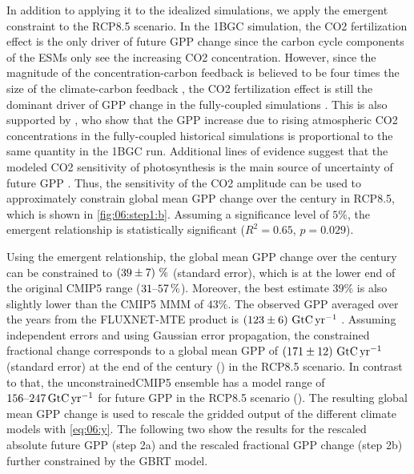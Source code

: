 In addition to applying it to the idealized simulations, we apply the emergent
constraint to the \acs{RCP}8.5 scenario. In the \ac{1BGC} simulation, the
\ac{CO2} fertilization effect is the only driver of future \ac{GPP} change
since the carbon cycle components of the \acp{ESM} only see the increasing
\ac{CO2} concentration. However, since the magnitude of the
concentration-carbon feedback is believed to be four times the size of the
climate-carbon feedback \autocite{Gregory2009}, the \ac{CO2} fertilization
effect is still the dominant driver of \ac{GPP} change in the fully-coupled
simulations \autocite{Huntzinger2017}. This is also supported by
\textcite{Wenzel2016}, who show that the \ac{GPP} increase due to rising
atmospheric \ac{CO2} concentrations in the fully-coupled historical simulations
is proportional to the same quantity in the \ac{1BGC} run. Additional lines of
evidence suggest that the modeled \ac{CO2} sensitivity of photosynthesis is the
main source of uncertainty of future \ac{GPP} \autocite{Arora2013, Haverd2020,
  Rogers2017}. Thus, the sensitivity of the \ac{CO2} amplitude can be used to
approximately constrain global mean \ac{GPP} change over the  century
in \acs{RCP}8.5, which is shown in \cref{fig:06:step1:b}. Assuming a
significance level of $5 \unit{\%}$, the emergent relationship is statistically
significant ($R^2 = 0.65$, $p = 0.029$).

Using the emergent relationship, the global mean \ac{GPP} change over the
 century can be constrained to $\pmrangeunit{39}{7}{\%}$ (standard
error), which is at the lower end of the original \acs{CMIP}5 range
($\rangeunit{31}{57}{\%}$). Moreover, the best estimate $39 \unit{\%}$ is also
slightly lower than the \acs{CMIP}5 \ac{MMM} of $43 \unit{\%}$. The observed
\ac{GPP} averaged over the years  from the FLUXNET-MTE
product is $\pmrangeunit{123}{6}{\GtCyr{}}$ \autocite{Jung2011}. Assuming
independent errors and using Gaussian error propagation, the constrained
fractional change corresponds to a global mean \ac{GPP} of
$\pmrangeunit{171}{12}{\GtCyr{}}$ (standard error) at the end of the 
century () in the \acs{RCP}8.5 scenario. In contrast to that,
the unconstrained\acs{CMIP}5 ensemble has a model range of
$\rangeunit{156}{247}{\GtCyr{}}$ for future \ac{GPP} in the \acs{RCP}8.5
scenario (). The resulting global mean \ac{GPP} change is
used to rescale the gridded output of the different climate models with
\cref{eq:06:y}. The following two  show the
results for the rescaled absolute future \ac{GPP} (step 2a) and the rescaled
fractional \ac{GPP} change (step 2b) further constrained by the \ac{GBRT}
model.


